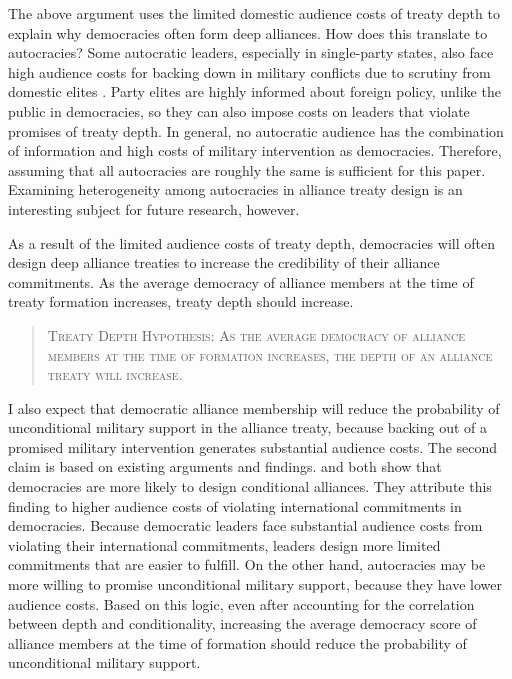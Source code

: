 \documentclass[12pt]{article}
\begin{document}
The above argument uses the limited domestic audience costs of treaty depth to explain why democracies often form deep alliances. 
How does this translate to autocracies? 
Some autocratic leaders, especially in single-party states, also face high audience costs for backing down in military conflicts due to scrutiny from domestic elites \citep{Weeks2014}. 
Party elites are highly informed about foreign policy, unlike the public in democracies, so they can also impose costs on leaders that violate promises of treaty depth. 
In general, no autocratic audience has the combination of information and high costs of military intervention as democracies.
Therefore, assuming that all autocracies are roughly the same is sufficient for this paper. 
Examining heterogeneity among autocracies in alliance treaty design is an interesting subject for future research, however. 


As a result of the limited audience costs of treaty depth, democracies will often design deep alliance treaties to increase the credibility of their alliance commitments. 
As the average democracy of alliance members at the time of treaty formation increases, treaty depth should increase. 


\begin{quote}
\textsc{Treaty Depth Hypothesis: As the average democracy of alliance members at the time of formation increases, the depth of an alliance treaty will increase.}
\end{quote} 


I also expect that democratic alliance membership will reduce the probability of unconditional military support in the alliance treaty, because backing out of a promised military intervention generates substantial audience costs. 
The second claim is based on existing arguments and findings. 
\citet{Mattes2012} and \citet{Chibaetal2015} both show that democracies are more likely to design conditional alliances. 
They attribute this finding to higher audience costs of violating international commitments in democracies. 
Because democratic leaders face substantial audience costs from violating their international commitments, leaders design more limited commitments that are easier to fulfill. 
On the other hand, autocracies may be more willing to promise unconditional military support, because they have lower audience costs. 
Based on this logic, even after accounting for the correlation between depth and conditionality, increasing the average democracy score of alliance members at the time of formation should reduce the probability of unconditional military support.
\end{document}
